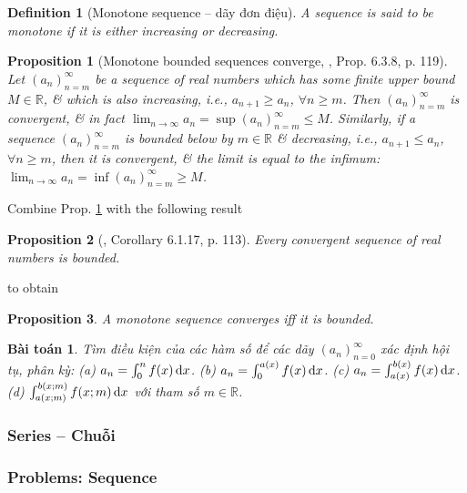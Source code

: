\documentclass{article}
\newtheorem{baitoan}{Bài toán}
\newtheorem{definition}{Definition}
\newtheorem{proposition}{Proposition}
\begin{document}
\begin{definition}[Monotone sequence -- dãy đơn điệu]
	A sequence is said to be {\rm monotone} if it is either increasing or decreasing.
\end{definition}

\begin{proposition}[Monotone bounded sequences converge, \cite{Tao_analysis_1}, Prop. 6.3.8, p. 119]
	\label{prop: monotone bounded sequences converge}
	Let $(a_n)_{n=m}^\infty$ be a sequence of real numbers which has some finite upper bound $M\in\mathbb{R}$, \& which is also increasing, i.e., $a_{n+1}\ge a_n$, $\forall n\ge m$. Then $(a_n)_{n=m}^\infty$ is convergent, \& in fact $\lim_{n\to\infty} a_n = \sup(a_n)_{n=m}^\infty\le M$. Similarly, if a sequence $(a_n)_{n=m}^\infty$ is bounded below by $m\in\mathbb{R}$ \& decreasing, i.e., $a_{n+1}\le a_n$, $\forall n\ge m$, then it is convergent, \& the limit is equal to the infimum: $\lim_{n\to\infty} a_n = \inf(a_n)_{n=m}^\infty\ge M$.
\end{proposition}
Combine Prop. \ref{prop: monotone bounded sequences converge} with the following result
\begin{proposition}[\cite{Tao_analysis_1}, Corollary 6.1.17, p. 113]
	Every convergent sequence of real numbers is bounded.
\end{proposition}
to obtain
\begin{proposition}
	A monotone sequence converges iff it is bounded.
\end{proposition}

\begin{baitoan}
	Tìm điều kiện của các hàm số để các dãy $(a_n)_{n=0}^\infty$ xác định hội tụ, phân kỳ: (a) $a_n = \int_0^n f(x)\,{\rm d}x$. (b) $a_n = \int_0^{a(x)} f(x)\,{\rm d}x$. (c) $a_n = \int_{a(x)}^{b(x)} f(x)\,{\rm d}x$. (d) $\int_{a(x;m)}^{b(x;m)} f(x;m)\,{\rm d}x$ với tham số $m\in\mathbb{R}$.
\end{baitoan}


\subsubsection{Series -- Chuỗi}


\subsubsection{Problems: Sequence}
\end{document}
